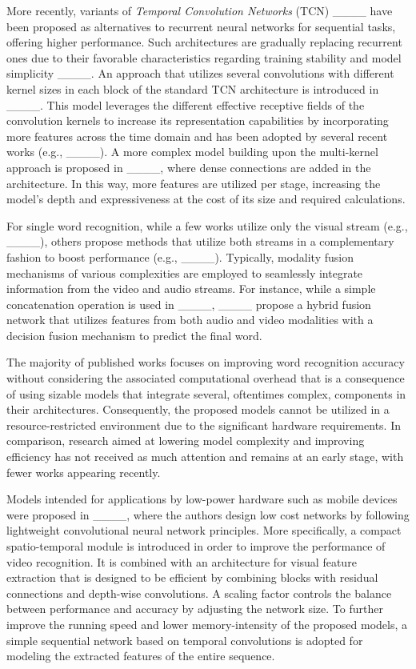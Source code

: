 More recently, variants of \textit{Temporal Convolution Networks} (TCN) ____ have been proposed as alternatives to recurrent neural networks for sequential tasks, offering higher performance.
Such architectures are gradually replacing recurrent ones due to their favorable characteristics regarding training stability and model simplicity ____.
An approach that utilizes several convolutions with different kernel sizes in each block of the standard TCN architecture is introduced in ____.
This model leverages the different effective receptive fields of the convolution kernels to increase its representation capabilities by incorporating more features across the time domain and has been adopted by several recent works (e.g., ____).
A more complex model building upon the multi-kernel approach is proposed in ____, where dense connections are added in the architecture.
In this way, more features are utilized per stage, increasing the model's depth and expressiveness at the cost of its size and required calculations.

For single word recognition, while a few works utilize only the visual stream (e.g., ____), others propose methods that utilize both streams in a complementary fashion to boost performance (e.g., ____). 
Typically, modality fusion mechanisms of various complexities are employed to seamlessly integrate information from the video and audio streams.
For instance, while a simple concatenation operation is used in ____, ____ propose a hybrid fusion network that utilizes features from both audio and video modalities with a decision fusion mechanism to predict the final word.

The majority of published works focuses on improving word recognition accuracy without considering the associated computational overhead that is a consequence of using sizable models that integrate several, oftentimes complex, components in their architectures.
Consequently, the proposed models cannot be utilized in a resource-restricted environment due to the significant hardware requirements.
In comparison, research aimed at lowering model complexity and improving efficiency has not received as much attention and remains at an early stage, with fewer works appearing recently.

Models intended for applications by low-power hardware such as mobile devices were proposed in ____, where the authors design low cost networks by following lightweight convolutional neural network principles.
More specifically, a compact spatio-temporal module is introduced in order to improve the performance of video recognition.
It is combined with an architecture for visual feature extraction that is designed to be efficient by combining blocks with residual connections and depth-wise convolutions.
A scaling factor controls the balance between performance and accuracy by adjusting the network size.
To further improve the running speed and lower memory-intensity of the proposed models, a simple sequential network based on temporal convolutions is adopted for modeling the extracted features of the entire sequence.

